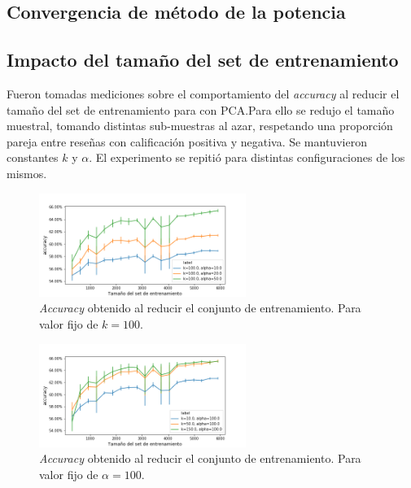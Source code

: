 \subsection{Convergencia de método de la potencia}%
\label{sub:pm}


\subsection{Impacto del tamaño del set de entrenamiento}%
\label{sub:exp_training_set}

%
Fueron tomadas mediciones sobre el comportamiento del \textit{accuracy} al
reducir el tamaño del set de entrenamiento para \knn{} con PCA.\@ Para ello se
redujo el tamaño muestral, tomando distintas sub-muestras al azar, respetando
una proporción pareja entre reseñas con calificación positiva y negativa.
Se mantuvieron constantes $k$ y $\alpha$. El experimento se repitió para
distintas configuraciones de los mismos.

\begin{figure}[ht]
    \centering
    \includegraphics[width=0.6\textwidth]{img/exp_subsampling_k_fijo}
    \caption{\textit{Accuracy} obtenido al reducir el conjunto de
    entrenamiento.  Para valor fijo de $k=100$.}%
    \label{fig:subsampling_k_fijo}
\end{figure}

\begin{figure}[ht]
    \centering
    \includegraphics[width=0.6\textwidth]{img/exp_subsampling_alpha_fijo}
    \caption{\textit{Accuracy} obtenido al reducir el conjunto de
    entrenamiento.  Para valor fijo de $\alpha=100$.}%
    \label{fig:subsampling_alpha_fijo}
\end{figure}

